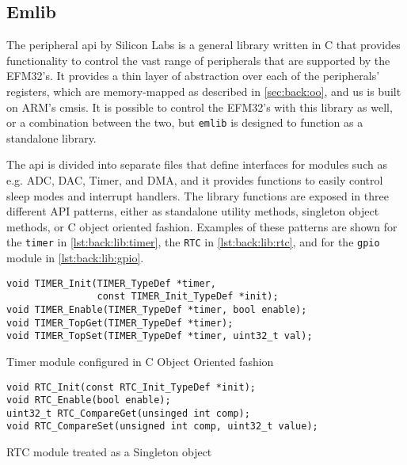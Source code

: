 \subsection{Emlib}
\label{sub:emlib}

The \emlib peripheral \gls{api} by Silicon Labs is a general library written in C that provides functionality to control the vast range of peripherals that are supported by the EFM32's.
It provides a thin layer of abstraction over each of the peripherals' registers, which are memory-mapped as described in \autoref{sec:back:oo}, and us is built on ARM's \gls{cmsis}.
It is possible to control the EFM32's with this library as well, or a combination between the two, but \texttt{emlib} is designed to function as a standalone library.

The \gls{api} is divided into separate files that define interfaces for modules such as e.g. ADC, DAC, Timer, and DMA, and it provides functions to easily control sleep modes and interrupt handlers.
The library functions are exposed in three different API patterns, either as standalone utility methods, singleton object methods, or C object oriented fashion.
Examples of these patterns are shown for the \texttt{timer} in \autoref{lst:back:lib:timer}, the \texttt{RTC} in \autoref{lst:back:lib:rtc}, and for the \texttt{gpio} module in \autoref{lst:back:lib:gpio}.

\begin{listing}[H]
  \begin{verbatim}
void TIMER_Init(TIMER_TypeDef *timer,
                const TIMER_Init_TypeDef *init);
void TIMER_Enable(TIMER_TypeDef *timer, bool enable);
void TIMER_TopGet(TIMER_TypeDef *timer);
void TIMER_TopSet(TIMER_TypeDef *timer, uint32_t val);
  \end{verbatim}
  \caption{Timer module configured in C Object Oriented fashion}
  \label{lst:back:lib:timer}
\end{listing}

\begin{listing}[H]
  \begin{verbatim}
void RTC_Init(const RTC_Init_TypeDef *init);
void RTC_Enable(bool enable);
uint32_t RTC_CompareGet(unsinged int comp);
void RTC_CompareSet(unsigned int comp, uint32_t value);
  \end{verbatim}
  \caption{RTC module treated as a Singleton object}
  \label{lst:back:lib:rtc}
\end{listing}

